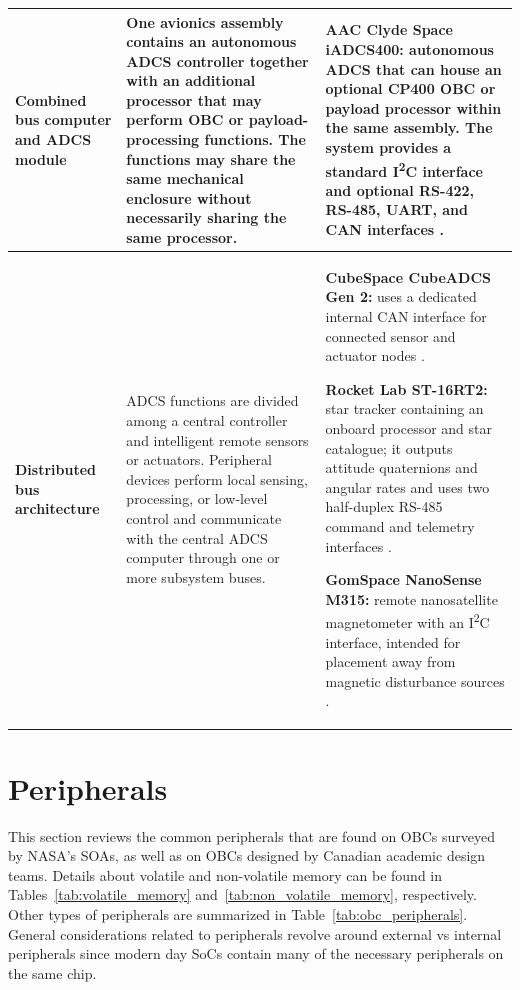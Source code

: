 \documentclass[10pt]{../datasheet}
\let\cite\citep
\begin{document}
\begin{longtable}{|p{}|p{}|p{}|}
\textbf{Combined bus computer and ADCS module}
&
One avionics assembly contains an autonomous ADCS controller together with an
 additional processor that may perform OBC or payload-processing functions. The
  functions may share the same mechanical enclosure without necessarily sharing 
  the same processor.
&
\textbf{AAC Clyde Space iADCS400:} autonomous ADCS that can house an optional
 CP400 OBC or payload processor within the same assembly. The system provides
  a standard I\textsuperscript{2}C interface and optional RS-422, RS-485, UART, 
  and CAN interfaces \cite[p.~1]{aac_iadcs400}.
\\
\hline

\textbf{Distributed bus architecture}
&
ADCS functions are divided among a central controller and intelligent remote
 sensors or actuators. Peripheral devices perform local sensing, processing, or
  low-level control and communicate with the central ADCS computer through one
   or more subsystem buses.
&
\textbf{CubeSpace CubeADCS Gen 2:} uses a dedicated internal CAN interface for
 connected sensor and actuator nodes \cite[pp.~17, 22]{cubespace_cubeadcs_gen2}.

\textbf{Rocket Lab ST-16RT2:} star tracker containing an onboard processor and
 star catalogue; it outputs attitude quaternions and angular rates and uses two
  half-duplex RS-485 command and telemetry interfaces \cite[p.~1]{rocketlab_st16rt2}.

\textbf{GomSpace NanoSense M315:} remote nanosatellite magnetometer with an
 I\textsuperscript{2}C interface, intended for placement away from magnetic
  disturbance sources \cite[p.~4]{gomspace_nanosense_m315}.
\\
\hline

\end{longtable}



\section{Peripherals}

This section reviews the common peripherals that are found on OBCs surveyed by
NASA's SOAs, as well as on OBCs designed by Canadian academic design teams. Details about volatile and non-volatile memory can be found in Tables~\ref{tab:volatile_memory} and~\ref{tab:non_volatile_memory}, respectively. Other types of peripherals are summarized in Table~\ref{tab:obc_peripherals}. General considerations related to peripherals revolve around external vs internal peripherals since modern day SoCs contain
many of the necessary peripherals on the same chip.
\end{document}
